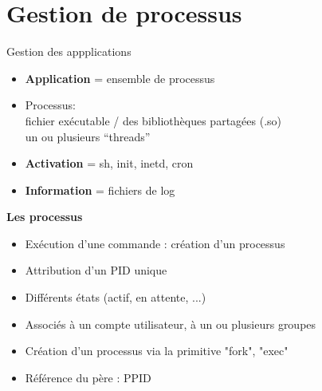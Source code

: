 \documentclass[french]{beamer}
\begin{document}



\section{Gestion de processus} 
\frame{\tableofcontents[current]}

\begin{frame}
Gestion des appplications
\begin{itemize}
\item \textbf{Application} = ensemble de processus
\item Processus:\\
fichier exécutable / des bibliothèques partagées (.so) \\
un ou plusieurs “threads”
\item \textbf{Activation} = sh, init, inetd, cron
\item \textbf{Information} = fichiers de log
\end{itemize}
\end{frame}


\begin{frame}
\textbf{Les processus}
\begin{itemize}
\item Exécution d'une commande : création d'un processus
\item Attribution d'un PID unique
\item Différents états (actif, en attente, ...)
\item Associés à un compte utilisateur, à un ou plusieurs groupes
\item Création d'un processus via la primitive "fork", "exec"
\item Référence du père : PPID

\end{itemize}
\end{frame}
\end{document}
